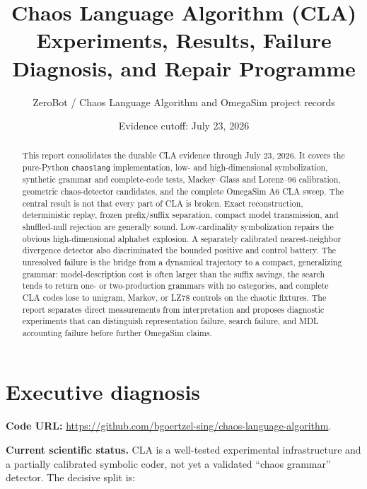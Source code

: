 \documentclass[10pt]{article}
\title{Chaos Language Algorithm (CLA)\\
Experiments, Results, Failure Diagnosis, and Repair Programme}
\author{ZeroBot / Chaos Language Algorithm and OmegaSim project records}
\date{Evidence cutoff: July 23, 2026}
\newcommand{\codeurl}{\url{https://github.com/bgoertzel-sing/chaos-language-algorithm}}
\begin{document}
\maketitle

\begin{abstract}
This report consolidates the durable CLA evidence through July 23, 2026. It
covers the pure-Python \texttt{chaoslang} implementation, low- and
high-dimensional symbolization, synthetic grammar and complete-code tests,
Mackey--Glass and Lorenz--96 calibration, geometric chaos-detector candidates,
and the complete OmegaSim A6 CLA sweep. The central result is not that every
part of CLA is broken. Exact reconstruction, deterministic replay, frozen
prefix/suffix separation, compact model transmission, and shuffled-null
rejection are generally sound. Low-cardinality symbolization repairs the
obvious high-dimensional alphabet explosion. A separately calibrated
nearest-neighbor divergence detector also discriminated the bounded positive
and control battery. The unresolved failure is the bridge from a dynamical
trajectory to a compact, generalizing grammar: model-description cost is often
larger than the suffix savings, the search tends to return one- or
two-production grammars with no categories, and complete CLA codes lose to
unigram, Markov, or LZ78 controls on the chaotic fixtures. The report separates
direct measurements from interpretation and proposes diagnostic experiments
that can distinguish representation failure, search failure, and MDL
accounting failure before further OmegaSim claims.
\end{abstract}

\section{Executive diagnosis}

\textbf{Code URL:} \codeurl.

\textbf{Current scientific status.} CLA is a well-tested experimental
infrastructure and a partially calibrated symbolic coder, not yet a validated
``chaos grammar'' detector. The decisive split is:
\end{document}
